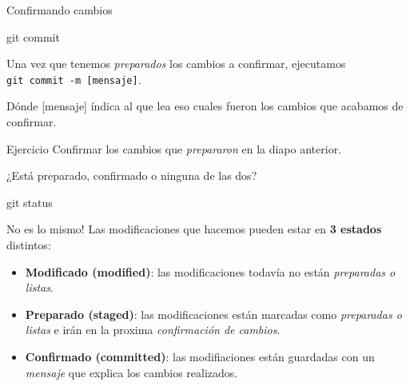 \begin{frame}[t]{Confirmando cambios}

    \begin{comando}
        git commit
    \end{comando}

    \pause
    \begin{block}{}
        Una vez que tenemos \textit{preparados} los cambios a confirmar,
        ejecutamos\\ \texttt{git commit -m [mensaje]}.

        Dónde [mensaje] índica al que lea eso cuales fueron los cambios que acabamos de confirmar.
    \end{block}

    \pause
    \vspace{1em}
    \begin{ejercicio}{Ejercicio}
        Confirmar los cambios que \textit{prepararon} en la diapo anterior.
    \end{ejercicio}

\end{frame}

\begin{frame}[fragile, t]{¿Está preparado, confirmado o ninguna de las dos?}

    \begin{comando}
        git status
    \end{comando}

    \begin{block}{No es lo mismo!}
        Las modificaciones que hacemos pueden estar en \textbf{3 estados} distintos:
        \begin{itemize}
            \pause
            \item<2-> \textbf{Modificado (modified)}: las modificaciones todavía no están \textit{preparadas o listas}.
            \item<3-> \textbf{Preparado (staged)}: las modificaciones están marcadas como \textit{preparadas o listas} e
                irán en la proxima \textit{confirmación de cambios}.
            \item<4-> \textbf{Confirmado (committed)}: las modifiaciones están guardadas con un \textit{mensaje} que explica los cambios realizados.
        \end{itemize}
    \end{block}

     {
        \gitstatusmodified
    }
     {
        \gitstatusready
    }
     {
        \gitstatusclean
    }

\end{frame}

